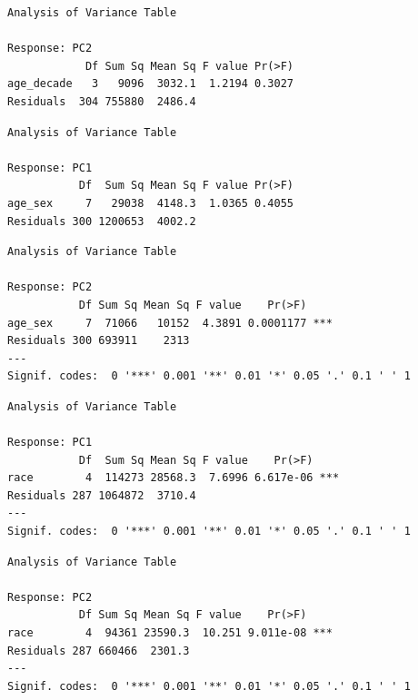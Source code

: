 \documentclass[
  letterpaper,
  DIV=11,
  numbers=noendperiod]{scrartcl}
\begin{document}
\begin{verbatim}
Analysis of Variance Table

Response: PC2
            Df Sum Sq Mean Sq F value Pr(>F)
age_decade   3   9096  3032.1  1.2194 0.3027
Residuals  304 755880  2486.4               
\end{verbatim}

\begin{verbatim}
Analysis of Variance Table

Response: PC1
           Df  Sum Sq Mean Sq F value Pr(>F)
age_sex     7   29038  4148.3  1.0365 0.4055
Residuals 300 1200653  4002.2               
\end{verbatim}

\begin{verbatim}
Analysis of Variance Table

Response: PC2
           Df Sum Sq Mean Sq F value    Pr(>F)    
age_sex     7  71066   10152  4.3891 0.0001177 ***
Residuals 300 693911    2313                      
---
Signif. codes:  0 '***' 0.001 '**' 0.01 '*' 0.05 '.' 0.1 ' ' 1
\end{verbatim}

\begin{verbatim}
Analysis of Variance Table

Response: PC1
           Df  Sum Sq Mean Sq F value    Pr(>F)    
race        4  114273 28568.3  7.6996 6.617e-06 ***
Residuals 287 1064872  3710.4                      
---
Signif. codes:  0 '***' 0.001 '**' 0.01 '*' 0.05 '.' 0.1 ' ' 1
\end{verbatim}

\begin{verbatim}
Analysis of Variance Table

Response: PC2
           Df Sum Sq Mean Sq F value    Pr(>F)    
race        4  94361 23590.3  10.251 9.011e-08 ***
Residuals 287 660466  2301.3                      
---
Signif. codes:  0 '***' 0.001 '**' 0.01 '*' 0.05 '.' 0.1 ' ' 1
\end{verbatim}
\end{document}

